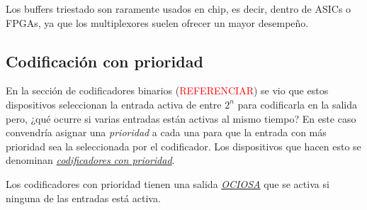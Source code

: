 Los buffers triestado son raramente usados en chip, es decir, dentro de ASICs o FPGAs, ya que los multiplexores suelen ofrecer un mayor desempeño.

\subsection{Codificación con prioridad}
En la sección de codificadores binarios (\textcolor{red}{REFERENCIAR}) se vio que estos dispositivos seleccionan la entrada activa de entre $2^n$ para codificarla en la salida pero, ¿qué ocurre si varias entradas están activas al mismo tiempo? En este caso convendría asignar una \emph{prioridad} a cada una para que la entrada con más prioridad sea la seleccionada por el codificador. Los dispositivos que hacen esto se denominan \hyperlink{priority_encoder}{\emph{codificadores con prioridad}}.

Los codificadores con prioridad tienen una salida \hyperlink{IDLE}{\emph{OCIOSA}} que se activa si ninguna de las entradas está activa.